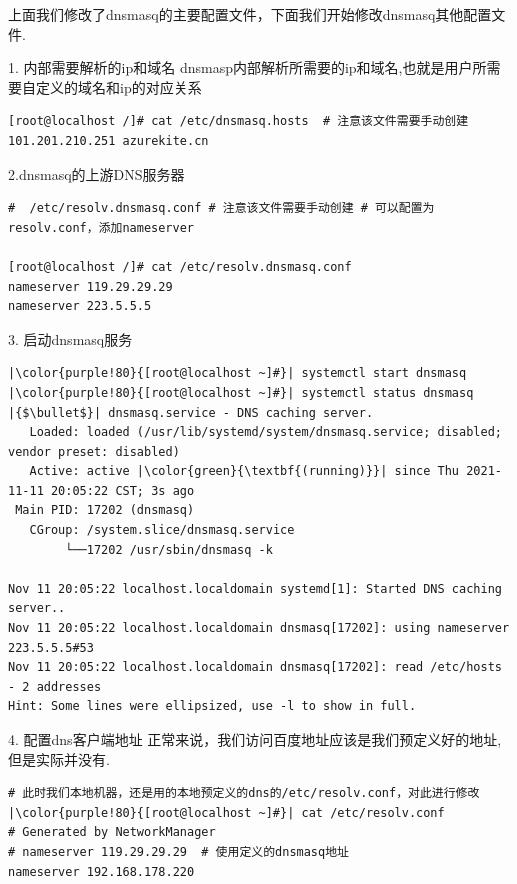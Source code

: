上面我们修改了dnsmasq的主要配置文件，下面我们开始修改dnsmasq其他配置文件.

\begin{ascboxB}{1. 内部需要解析的ip和域名}
dnsmasp内部解析所需要的ip和域名,也就是用户所需要自定义的域名和ip的对应关系

\begin{verbatim}
[root@localhost /]# cat /etc/dnsmasq.hosts  # 注意该文件需要手动创建
101.201.210.251 azurekite.cn
\end{verbatim}
	\end{ascboxB}
\begin{ascboxB}{2.dnsmasq的上游DNS服务器}
\begin{verbatim}
#  /etc/resolv.dnsmasq.conf # 注意该文件需要手动创建 # 可以配置为resolv.conf，添加nameserver

[root@localhost /]# cat /etc/resolv.dnsmasq.conf
nameserver 119.29.29.29
nameserver 223.5.5.5
\end{verbatim}
\end{ascboxB}

\begin{ascboxB}{3. 启动dnsmasq服务}
\begin{verbatim}
|\color{purple!80}{[root@localhost ~]#}| systemctl start dnsmasq
|\color{purple!80}{[root@localhost ~]#}| systemctl status dnsmasq
|{$\bullet$}| dnsmasq.service - DNS caching server.
   Loaded: loaded (/usr/lib/systemd/system/dnsmasq.service; disabled; vendor preset: disabled)
   Active: active |\color{green}{\textbf{(running)}}| since Thu 2021-11-11 20:05:22 CST; 3s ago
 Main PID: 17202 (dnsmasq)
   CGroup: /system.slice/dnsmasq.service
        └──17202 /usr/sbin/dnsmasq -k

Nov 11 20:05:22 localhost.localdomain systemd[1]: Started DNS caching server..
Nov 11 20:05:22 localhost.localdomain dnsmasq[17202]: using nameserver 223.5.5.5#53
Nov 11 20:05:22 localhost.localdomain dnsmasq[17202]: read /etc/hosts - 2 addresses
Hint: Some lines were ellipsized, use -l to show in full.
\end{verbatim}
\end{ascboxB}

\begin{ascboxB}{4. 配置dns客户端地址}
正常来说，我们访问百度地址应该是我们预定义好的地址,但是实际并没有.
\begin{verbatim}
# 此时我们本地机器，还是用的本地预定义的dns的/etc/resolv.conf，对此进行修改
|\color{purple!80}{[root@localhost ~]#}| cat /etc/resolv.conf
# Generated by NetworkManager
# nameserver 119.29.29.29  # 使用定义的dnsmasq地址
nameserver 192.168.178.220
\end{verbatim}
\end{ascboxB}

